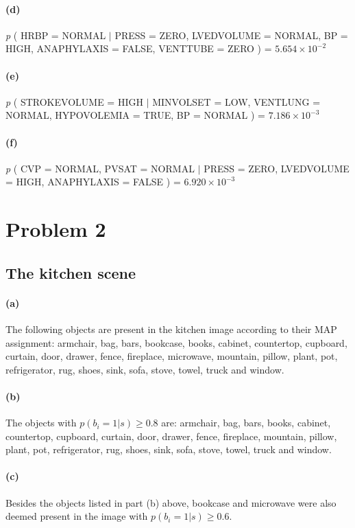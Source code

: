 \documentclass[11pt]{article}
\newcommand{\pr}[1]{\ensuremath{p(#1)}}
\begin{document}
\paragraph{(d)}
    \emph{p} ( HRBP = NORMAL $|$ PRESS = ZERO, LVEDVOLUME = NORMAL, BP = HIGH,
        ANAPHYLAXIS = FALSE, VENTTUBE = ZERO )
        = $5.654 \times 10^{-2}$

\paragraph{(e)}
    \emph{p} ( STROKEVOLUME = HIGH $|$ MINVOLSET = LOW, VENTLUNG = NORMAL,
    HYPOVOLEMIA = TRUE, BP = NORMAL ) = $7.186 \times 10^{-3}$

\paragraph{(f)}
    \emph{p} ( CVP = NORMAL, PVSAT = NORMAL $|$ PRESS = ZERO, LVEDVOLUME =
    HIGH, ANAPHYLAXIS = FALSE ) = $6.920\times 10^{-3}$

\clearpage

\section{Problem 2}

\subsection{The kitchen scene}

\paragraph{(a)} The following objects are present in the kitchen image
according to their MAP assignment: armchair, bag, bars, bookcase, books,
cabinet, countertop, cupboard, curtain, door, drawer, fence, fireplace,
microwave, mountain, pillow, plant, pot, refrigerator, rug, shoes, sink,
sofa, stove, towel, truck and window.

\paragraph{(b)} The objects with $\pr{b_i=1|s} \ge 0.8$ are: armchair, bag,
bars, books, cabinet, countertop, cupboard, curtain, door, drawer, fence,
fireplace, mountain, pillow, plant, pot, refrigerator, rug, shoes, sink,
sofa, stove, towel, truck and window.

\paragraph{(c)} Besides the objects listed in part (b) above, bookcase and
microwave were also deemed present in the image with $\pr{b_i=1|s} \ge 0.6$.
\end{document}

